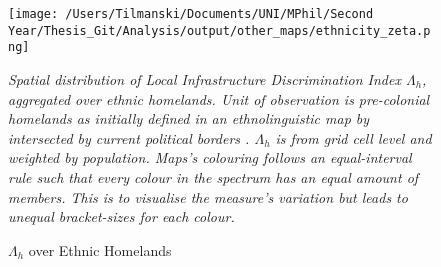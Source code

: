 \documentclass[11pt, oneside]{article}   	%
\newcommand{\mysubcaption}[1]{
\justify
\begin{spacing}{0.7}
\textit{\footnotesize #1}
\end{spacing}}
\begin{document}
\begin{figure}
\centering
\caption{$\Lambda_{h}$ over Ethnic Homelands}

\texttt{[image: /Users/Tilmanski/Documents/UNI/MPhil/Second Year/Thesis\_Git/Analysis/output/other\_maps/ethnicity\_zeta.png]}


\label{fig:ethn_maps}
\mysubcaption{Spatial distribution of Local Infrastructure Discrimination Index $\Lambda_{h}$, aggregated over ethnic homelands. Unit of observation is pre-colonial homelands as initially defined in an ethnolinguistic map by \cite{Murdock_Africaitspeoples_1959} intersected by current political borders  \citep[following][]{michalopoulos_long-run_2016}. $\Lambda_{h}$ is from grid cell level and weighted by population. Maps's colouring follows an equal-interval rule such that every colour in the spectrum has an equal amount of members. This is to visualise the measure's variation but leads to unequal bracket-sizes for each colour.}
\end{figure}
\end{document}
